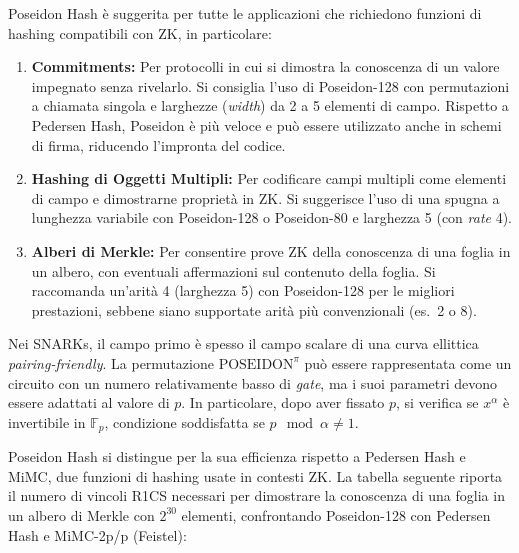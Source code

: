 Poseidon Hash è suggerita per tutte le applicazioni che richiedono funzioni di hashing compatibili con ZK, in particolare:
\begin{enumerate}
    \item \textbf{Commitments:} Per protocolli in cui si dimostra la conoscenza di un valore impegnato senza rivelarlo. Si consiglia l’uso di Poseidon-128 con permutazioni a chiamata singola e larghezze (\textit{width}) da 2 a 5 elementi di campo. Rispetto a Pedersen Hash, Poseidon è più veloce e può essere utilizzato anche in schemi di firma, riducendo l’impronta del codice.
    \item \textbf{Hashing di Oggetti Multipli:} Per codificare campi multipli come elementi di campo e dimostrarne proprietà in ZK. Si suggerisce l’uso di una spugna a lunghezza variabile con Poseidon-128 o Poseidon-80 e larghezza 5 (con \textit{rate} 4).
    \item \textbf{Alberi di Merkle:} Per consentire prove ZK della conoscenza di una foglia in un albero, con eventuali affermazioni sul contenuto della foglia. Si raccomanda un’arità 4 (larghezza 5) con Poseidon-128 per le migliori prestazioni, sebbene siano supportate arità più convenzionali (es.\ 2 o 8).
\end{enumerate}

Nei SNARKs, il campo primo è spesso il campo scalare di una curva ellittica \textit{pairing-friendly}. La permutazione \(\text{POSEIDON}^\pi\) può essere rappresentata come un circuito con un numero relativamente basso di \textit{gate}, ma i suoi parametri devono essere adattati al valore di \(p\). In particolare, dopo aver fissato \(p\), si verifica se \(x^\alpha\) è invertibile in \(\mathbb{F}_p\), condizione soddisfatta se \(p \mod \alpha \neq 1\).

Poseidon Hash si distingue per la sua efficienza rispetto a Pedersen Hash e MiMC, due funzioni di hashing usate in contesti ZK. La tabella seguente riporta il numero di vincoli R1CS necessari per dimostrare la conoscenza di una foglia in un albero di Merkle con \(2^{30}\) elementi, confrontando Poseidon-128 con Pedersen Hash e MiMC-2p/p (Feistel):

